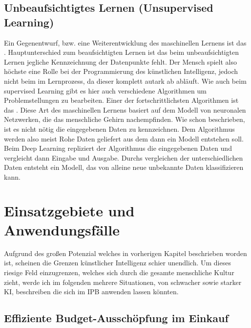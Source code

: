 \documentclass[a4paper,12pt,german,ngerman]{report}
\begin{document}
    \section{Unbeaufsichtigtes Lernen (Unsupervised Learning) }
        Ein Gegenentwurf, bzw. eine Weiterentwicklung des maschinellen Lernens ist das .
        Hauptunterschied zum beaufsichtigten Lernen ist das beim unbeaufsichtigten Lernen jegliche Kennzeichnung der Datenpunkte fehlt.
        Der Mensch spielt also höchste eine Rolle bei der Programmierung des künstlichen Intelligenz, jedoch nicht beim
        im Lernprozess, da dieser komplett autark ab abläuft. Wie auch beim supervised Learning gibt es hier auch verschiedene
        Algorithmen um Problemstellungen zu bearbeiten. Einer der fortschrittlichsten Algorithmen ist das .
        Diese Art des maschinellen Lernens basiert auf dem Modell von neuronalen Netzwerken, die das menschliche
        Gehirn nachempfinden.\autocite[how deep learning works]{ibm2021deeplearning}
        Wie schon beschrieben, ist es nicht nötig die eingegebenen Daten zu kennzeichnen. Dem Algorithmus werden also
        meist Rohe Daten geliefert aus dem dann ein Modell entstehen soll. Beim Deep Learning repliziert der Algorithmus
        die eingegebenen Daten und vergleicht dann Eingabe und Ausgabe. Durchs vergleichen der unterschiedlichen Daten
        entsteht ein Modell, das von alleine neue unbekannte Daten klassifizieren kann.



    \chapter{Einsatzgebiete und Anwendungsfälle}
    Aufgrund des großen Potenzial welches in vorherigen Kapitel beschrieben worden ist, scheinen
    die Grenzen künstlicher Intelligenz schier unendlich. Um dieses riesige Feld einzugrenzen,
    welches sich durch die gesamte menschliche Kultur zieht, werde ich im folgenden mehrere
    Situationen, von schwacher sowie starker KI, beschreiben die sich im IPB anwenden lassen könnten.

    \section{Effiziente Budget-Ausschöpfung im Einkauf}
    \section{}
\end{document}
